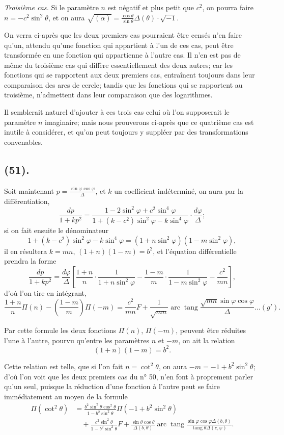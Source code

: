 \documentclass{article}
\begin{document}
\emph{Troisième cas.} Si le paramètre $n$ est négatif et plus petit que $c^{2}$, on pourra faire $n=-c^{2}\sin^{2}\theta$, et on aura $\sqrt{(\alpha)}=\frac{\cos\theta}{\sin\theta}\Delta(\theta)\cdot\sqrt{-1}$.

On verra ci-après que les deux premiers cas pourraient être censés n'en faire qu'un, attendu qu'une fonction qui appartient à l'un de ces cas, peut être transformée en une fonction qui appartienne à l'autre cas. Il n'en est pas de même du troisième cas qui diffère essentiellement des deux autres; car les fonctions qui se rapportent aux deux premiers cas, entraînent toujours dans leur comparaison des arcs de cercle; tandis que les fonctions qui se rapportent au troisième, n'admettent dans leur comparaison que des logarithmes.

Il semblerait naturel d'ajouter à ces trois cas celui où l'on supposerait le paramètre $n$ imaginaire; mais nous prouverons ci-après que ce quatrième cas est inutile à considérer, et qu'on peut toujours y suppléer par des transformations convenables.

\subsection*{(51).}

Soit maintenant $p=\frac{\sin\varphi\cos\varphi}{\Delta}$, et $k$ un coefficient indéterminé, on aura par la différentiation,
\[ \frac{dp}{1+kp^{2}}=\frac{1-2\sin^{2}\varphi+c^{2}\sin^{4}\varphi}{1+(k-c^{2})\sin^{2}\varphi-k\sin^{4}\varphi}\cdot\frac{d\varphi}{\Delta}; \]
si on fait ensuite le dénominateur
\[ 1+(k-c^{2})\sin^{2}\varphi-k\sin^{4}\varphi=(1+n\sin^{2}\varphi)(1-m\sin^{2}\varphi), \]
il en résultera $k=mn$, $(1+n)(1-m)=b^{2}$, et l'équation différentielle prendra la forme
\[ \frac{dp}{1+kp^{2}}=\frac{d\varphi}{\Delta}\left[\frac{1+n}{n}\cdot\frac{1}{1+n\sin^{2}\varphi}-\frac{1-m}{m}\cdot\frac{1}{1-m\sin^{2}\varphi}-\frac{c^{2}}{mn}\right], \]
d'où l'on tire en intégrant,
\[ \frac{1+n}{n}\Pi(n)-\left(\frac{1-m}{m}\right)\Pi(-m)=\frac{c^{2}}{mn}F+\frac{1}{\sqrt{mn}}\operatorname{arc}\operatorname{tang}\frac{\sqrt{mn}\sin\varphi\cos\varphi}{\Delta}\ldots(g'). \]

Par cette formule les deux fonctions $\Pi(n)$, $\Pi(-m)$, peuvent être réduites l'une à l'autre, pourvu qu'entre les paramètres $n$ et $-m$, on ait la relation
\[ (1+n)(1-m)=b^{2}. \]

Cette relation est telle, que si l'on fait $n=\cot^{2}\theta$, on aura $-m=-1+b^{2}\sin^{2}\theta$; d'où l'on voit que les deux premiers cas du n° 50, n'en font à proprement parler qu'un seul, puisque la réduction d'une fonction à l'autre peut se faire immédiatement au moyen de la formule
\[ \begin{aligned} \Pi(\cot^{2}\theta)&=\frac{b^{2}\sin^{2}\theta\cos^{2}\theta}{1-b^{2}\sin^{2}\theta}\Pi(-1+b^{2}\sin^{2}\theta)\\ &\quad+\frac{c^{2}\sin^{2}\theta}{1-b^{2}\sin^{2}\theta}F+\frac{\sin\theta\cos\theta}{\Delta(b,\theta)}\operatorname{arc}\operatorname{tang}\frac{\sin\varphi\cos\varphi\Delta(b,\theta)}{\operatorname{tang}\theta\Delta(c,\varphi)}. \end{aligned} \]
\end{document}
